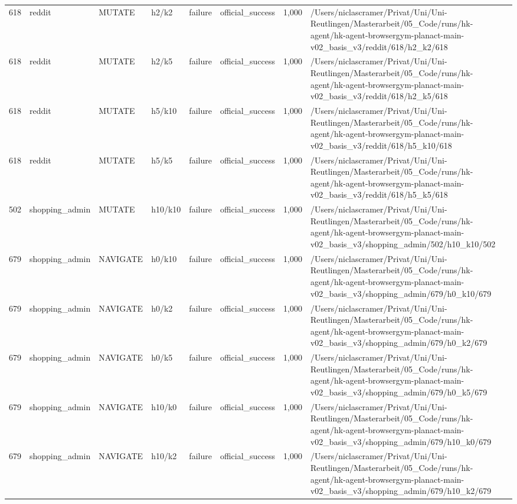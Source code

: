 \begin{longtable}{rlllllrl}
618 & reddit & MUTATE & h2/k2 & failure & official\_success & 1,000 & /Users/niclascramer/Privat/Uni/Uni-Reutlingen/Masterarbeit/05\_Code/runs/hk-agent/hk-agent-browsergym-planact-main-v02\_basis\_v3/reddit/618/h2\_k2/618 \\
618 & reddit & MUTATE & h2/k5 & failure & official\_success & 1,000 & /Users/niclascramer/Privat/Uni/Uni-Reutlingen/Masterarbeit/05\_Code/runs/hk-agent/hk-agent-browsergym-planact-main-v02\_basis\_v3/reddit/618/h2\_k5/618 \\
618 & reddit & MUTATE & h5/k10 & failure & official\_success & 1,000 & /Users/niclascramer/Privat/Uni/Uni-Reutlingen/Masterarbeit/05\_Code/runs/hk-agent/hk-agent-browsergym-planact-main-v02\_basis\_v3/reddit/618/h5\_k10/618 \\
618 & reddit & MUTATE & h5/k5 & failure & official\_success & 1,000 & /Users/niclascramer/Privat/Uni/Uni-Reutlingen/Masterarbeit/05\_Code/runs/hk-agent/hk-agent-browsergym-planact-main-v02\_basis\_v3/reddit/618/h5\_k5/618 \\
502 & shopping\_admin & MUTATE & h10/k10 & failure & official\_success & 1,000 & /Users/niclascramer/Privat/Uni/Uni-Reutlingen/Masterarbeit/05\_Code/runs/hk-agent/hk-agent-browsergym-planact-main-v02\_basis\_v3/shopping\_admin/502/h10\_k10/502 \\
679 & shopping\_admin & NAVIGATE & h0/k10 & failure & official\_success & 1,000 & /Users/niclascramer/Privat/Uni/Uni-Reutlingen/Masterarbeit/05\_Code/runs/hk-agent/hk-agent-browsergym-planact-main-v02\_basis\_v3/shopping\_admin/679/h0\_k10/679 \\
679 & shopping\_admin & NAVIGATE & h0/k2 & failure & official\_success & 1,000 & /Users/niclascramer/Privat/Uni/Uni-Reutlingen/Masterarbeit/05\_Code/runs/hk-agent/hk-agent-browsergym-planact-main-v02\_basis\_v3/shopping\_admin/679/h0\_k2/679 \\
679 & shopping\_admin & NAVIGATE & h0/k5 & failure & official\_success & 1,000 & /Users/niclascramer/Privat/Uni/Uni-Reutlingen/Masterarbeit/05\_Code/runs/hk-agent/hk-agent-browsergym-planact-main-v02\_basis\_v3/shopping\_admin/679/h0\_k5/679 \\
679 & shopping\_admin & NAVIGATE & h10/k0 & failure & official\_success & 1,000 & /Users/niclascramer/Privat/Uni/Uni-Reutlingen/Masterarbeit/05\_Code/runs/hk-agent/hk-agent-browsergym-planact-main-v02\_basis\_v3/shopping\_admin/679/h10\_k0/679 \\
679 & shopping\_admin & NAVIGATE & h10/k2 & failure & official\_success & 1,000 & /Users/niclascramer/Privat/Uni/Uni-Reutlingen/Masterarbeit/05\_Code/runs/hk-agent/hk-agent-browsergym-planact-main-v02\_basis\_v3/shopping\_admin/679/h10\_k2/679 \\

\end{longtable}
